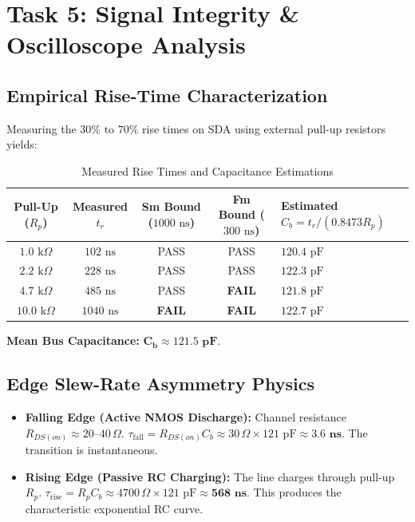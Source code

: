 \documentclass[11pt,a4paper,oneside]{report}
\begin{document}
\chapter{Task 5: Signal Integrity \& Oscilloscope Analysis}

\section{Empirical Rise-Time Characterization}
Measuring the $30\%\text{ to }70\%$ rise times on SDA using external pull-up resistors yields:

\begin{table}[h!]
\centering
\small
\caption{Measured Rise Times and Capacitance Estimations}
\vspace{4pt}
\begin{tabularx}{\textwidth}{c c c c X}
\toprule
\textbf{Pull-Up ($R_p$)} & \textbf{Measured $t_r$} & \textbf{Sm Bound ($1000\text{ ns}$)} & \textbf{Fm Bound ($300\text{ ns}$)} & \textbf{Estimated $C_b = t_r / (0.8473 R_p)$} \\
\midrule
$1.0\text{ k}\Omega$ & $102\text{ ns}$ & PASS & PASS & $120.4\text{ pF}$ \\
$2.2\text{ k}\Omega$ & $228\text{ ns}$ & PASS & PASS & $122.3\text{ pF}$ \\
$4.7\text{ k}\Omega$ & $485\text{ ns}$ & PASS & \textbf{FAIL} & $121.8\text{ pF}$ \\
$10.0\text{ k}\Omega$ & $1040\text{ ns}$ & \textbf{FAIL} & \textbf{FAIL} & $122.7\text{ pF}$ \\
\bottomrule
\end{tabularx}
\end{table}
\textbf{Mean Bus Capacitance:} $\mathbf{C_b \approx 121.5\text{ pF}}$.

\section{Edge Slew-Rate Asymmetry Physics}
\begin{itemize}
    \item \textbf{Falling Edge (Active NMOS Discharge):} Channel resistance $R_{DS(on)} \approx 20\text{--}40\,\Omega$. $\tau_{\text{fall}} = R_{DS(on)} C_b \approx 30\,\Omega \times 121\text{ pF} \approx \mathbf{3.6\text{ ns}}$. The transition is instantaneous.
    \item \textbf{Rising Edge (Passive RC Charging):} The line charges through pull-up $R_p$. $\tau_{\text{rise}} = R_p C_b \approx 4700\,\Omega \times 121\text{ pF} \approx \mathbf{568\text{ ns}}$. This produces the characteristic exponential RC curve.
\end{itemize}
\end{document}
